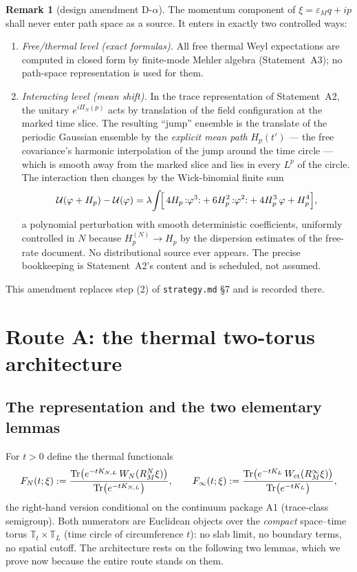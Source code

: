 \documentclass[11pt,a4paper]{article}
\theoremstyle{plain}
\theoremstyle{definition}
\newtheorem{remark}[theorem]{Remark}
\newcommand{\T}{\mathbb{T}}
\newcommand{\eps}{\varepsilon}
\DeclareMathOperator{\Trace}{Tr}
\begin{document}
\begin{remark}[design amendment D-$\alpha$]\label{rem:amendment}
The momentum component of $\xi=\eps_Mq+ip$ shall never enter path space as a source.
It enters in exactly two controlled ways:
\begin{enumerate}
\item \emph{Free/thermal level (exact formulas).} All free thermal Weyl expectations
are computed in closed form by finite-mode Mehler algebra (Statement~A3); no path-space
representation is used for them.
\item \emph{Interacting level (mean shift).} In the trace representation of
Statement~A2, the unitary $e^{i\Pi_N(p)}$ acts by translation of the field
configuration at the marked time slice. The resulting ``jump'' ensemble is the
translate of the periodic Gaussian ensemble by the \emph{explicit mean path}
$H_p(t')$ --- the free covariance's harmonic interpolation of the jump around the time
circle --- which is smooth away from the marked slice and lies in every
$L^p$ of the circle. The interaction then changes by the Wick-binomial finite sum
\begin{equation}
 \mathcal U(\varphi+H_p)-\mathcal U(\varphi)
 =\lambda\!\int\!\Bigl[\,4H_p\,{:}\varphi^3{:}+6H_p^2\,{:}\varphi^2{:}
 +4H_p^3\,\varphi+H_p^4\Bigr],
 \label{eq:meanshift}
\end{equation}
a polynomial perturbation with smooth deterministic coefficients, uniformly
controlled in $N$ because $H^{(N)}_p\to H_p$ by the dispersion estimates of the
free-rate document. No distributional source ever appears. The precise bookkeeping is
Statement~A2's content and is scheduled, not assumed.
\end{enumerate}
This amendment replaces step (2) of \texttt{strategy.md} \S7 and is recorded there.
\end{remark}

\section{Route A: the thermal two-torus architecture}\label{sec:routeA}

\subsection{The representation and the two elementary lemmas}

For $t>0$ define the thermal functionals
\begin{equation}
 F_N(t;\xi):=\frac{\Trace\bigl(e^{-tK_{N,L}}\,W_N(R_M^N\xi)\bigr)}
                  {\Trace\bigl(e^{-tK_{N,L}}\bigr)},
 \qquad
 F_\infty(t;\xi):=\frac{\Trace\bigl(e^{-tK_{L}}\,W_{\rm ct}(R_M^\infty\xi)\bigr)}
                  {\Trace\bigl(e^{-tK_{L}}\bigr)},
 \label{eq:thermal}
\end{equation}
the right-hand version conditional on the continuum package A1 (trace-class
semigroup). Both numerators are Euclidean objects over the \emph{compact} space--time
torus $\T_t\times\T_L$ (time circle of circumference $t$): no slab limit, no boundary
terms, no spatial cutoff. The architecture rests on the following two lemmas, which we
prove now because the entire route stands on them.
\end{document}
